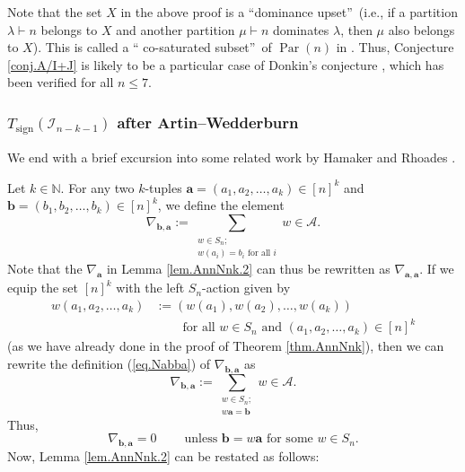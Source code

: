 \documentclass[numbers=enddot,12pt,final,onecolumn,notitlepage]{scrartcl}%
\numberwithin{exer}{subsection}
\theoremstyle{definition}
\let\sumnonlimits\sum
\renewcommand{\sum}{\sumnonlimits\limits}
\newenvironment{noncompile}{}{}
\begin{document}
\begin{noncompile}
\label{rmk.A/I+J.murphy}Note that the set $X$ in the above proof is a
\textquotedblleft dominance upset\textquotedblright\ (i.e., if a partition
$\lambda\vdash n$ belongs to $X$ and another partition $\mu\vdash n$ dominates
$\lambda$, then $\mu$ also belongs to $X$). This is called a \textquotedblleft
co-saturated subset\textquotedblright\ of $\operatorname*{Par}\left(
n\right)  $ in \cite{Donkin24}. Thus, Conjecture \ref{conj.A/I+J} is likely to
be a particular case of Donkin's conjecture \cite[Remark 2.14]{Donkin24},
which has been verified for all $n\leq7$.
\end{noncompile}

\subsubsection{$T_{\operatorname*{sign}}\left(  \mathcal{I}_{n-k-1}\right)  $
after Artin--Wedderburn}

We end with a brief excursion into some related work by Hamaker and Rhoades
\cite{HamRho25}.

Let $k\in\mathbb{N}$. For any two $k$-tuples $\mathbf{a}=\left(  a_{1}%
,a_{2},\ldots,a_{k}\right)  \in\left[  n\right]  ^{k}$ and $\mathbf{b}=\left(
b_{1},b_{2},\ldots,b_{k}\right)  \in\left[  n\right]  ^{k}$, we define the
element%
\begin{equation}
\nabla_{\mathbf{b},\mathbf{a}}:=\sum_{\substack{w\in S_{n};\\w\left(
a_{i}\right)  =b_{i}\text{ for all }i}}w\in\mathcal{A}. \label{eq.Nabba}%
\end{equation}
Note that the $\nabla_{\mathbf{a}}$ in Lemma \ref{lem.AnnNnk.2} can thus be
rewritten as $\nabla_{\mathbf{a},\mathbf{a}}$. If we equip the set $\left[
n\right]  ^{k}$ with the left $S_{n}$-action given by%
\begin{align*}
w\left(  a_{1},a_{2},\ldots,a_{k}\right)   &  :=\left(  w\left(  a_{1}\right)
,w\left(  a_{2}\right)  ,\ldots,w\left(  a_{k}\right)  \right) \\
&  \ \ \ \ \ \ \ \ \ \ \text{for all }w\in S_{n}\text{ and }\left(
a_{1},a_{2},\ldots,a_{k}\right)  \in\left[  n\right]  ^{k}%
\end{align*}
(as we have already done in the proof of Theorem \ref{thm.AnnNnk}), then we
can rewrite the definition (\ref{eq.Nabba}) of $\nabla_{\mathbf{b},\mathbf{a}%
}$ as%
\begin{equation}
\nabla_{\mathbf{b},\mathbf{a}}:=\sum_{\substack{w\in S_{n};\\w\mathbf{a}%
=\mathbf{b}}}w\in\mathcal{A}. \label{eq.Nabba.2}%
\end{equation}
Thus,%
\begin{equation}
\nabla_{\mathbf{b},\mathbf{a}}=0\ \ \ \ \ \ \ \ \ \ \text{unless }%
\mathbf{b}=w\mathbf{a}\text{ for some }w\in S_{n}. \label{eq.Nabba.0}%
\end{equation}
Now, Lemma \ref{lem.AnnNnk.2} can be restated as follows:
\end{document}
